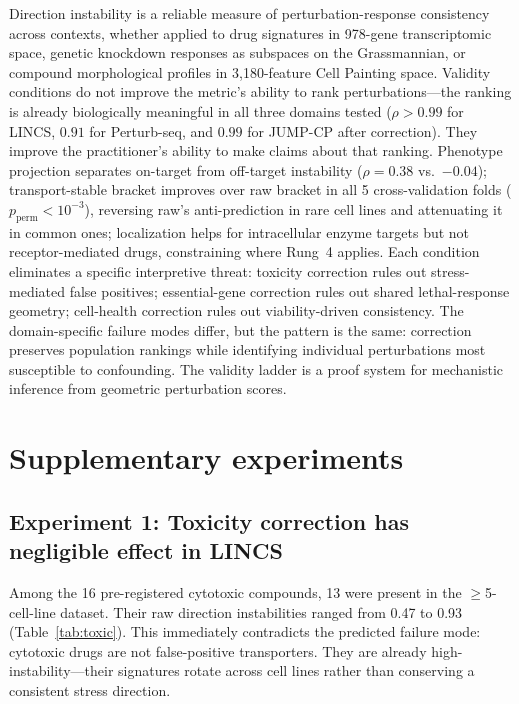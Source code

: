 \documentclass{article}
\begin{document}
Direction instability is a reliable measure of perturbation-response
consistency across contexts, whether applied to drug signatures in 978-gene
transcriptomic space, genetic knockdown responses as subspaces on the
Grassmannian, or compound morphological profiles in 3{,}180-feature Cell
Painting space. Validity conditions do not improve the metric's ability to
rank perturbations---the ranking is already biologically meaningful in all
three domains tested ($\rho > 0.99$ for LINCS, $0.91$ for Perturb-seq,
and $0.99$ for JUMP-CP after correction).
They improve the practitioner's ability to make claims about that ranking.
Phenotype projection separates on-target from off-target instability
($\rho = 0.38$ vs.\ $-0.04$); transport-stable bracket improves over raw bracket in all 5
cross-validation folds ($p_{\text{perm}} < 10^{-3}$), reversing raw's
anti-prediction in rare cell lines and attenuating it in common ones;
localization
helps for intracellular enzyme targets but not receptor-mediated drugs,
constraining where Rung~4 applies. Each condition eliminates a specific
interpretive threat: toxicity correction rules out stress-mediated false
positives; essential-gene correction rules out shared lethal-response
geometry; cell-health correction rules out viability-driven consistency.
The domain-specific failure modes differ, but the pattern is the same:
correction preserves population rankings while identifying individual
perturbations most susceptible to confounding. The validity ladder is a
proof system for mechanistic inference from geometric perturbation scores.




\appendix
\section{Supplementary experiments}

\subsection{Experiment 1: Toxicity correction has negligible effect in LINCS}

Among the 16 pre-registered cytotoxic compounds, 13 were present in the
$\geq$5-cell-line dataset. Their raw direction instabilities ranged from
0.47 to 0.93 (Table~\ref{tab:toxic}). This immediately contradicts the
predicted failure mode: cytotoxic drugs are not false-positive transporters.
They are already high-instability---their signatures rotate across cell lines
rather than conserving a consistent stress direction.
\end{document}
